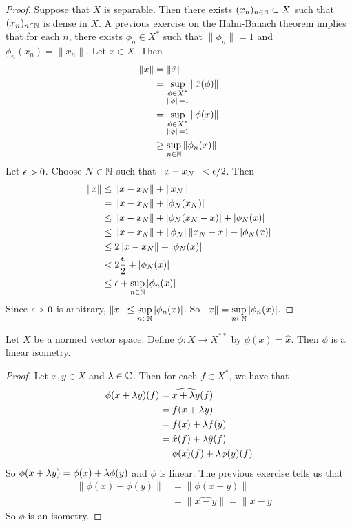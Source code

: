 \documentclass{book}
\begin{document}
	\begin{proof}
		Suppose that $X$ is separable. Then there exists $(x_n)_{n \in \mathbb{N}} \subset X$ such that $(x_n)_{n \in \mathbb{N}}$ is dense in $X$. A previous exercise on the Hahn-Banach theorem implies that for each $n$, there exists $\phi_n \in X^*$ such that $\|\phi_n\| = 1$ and $\phi_n(x_n) = \|x_n\|$. Let $x \in X$. Then 
		\begin{align*}
			\|x\| 
			&= \|\hat{x}\| \\
			&= \sup_{\substack{\phi \in X^* \\ \|\phi\| = 1}} \|\hat{x}(\phi)\| \\
			&= \sup_{\substack{\phi \in X^* \\ \|\phi\| = 1}} \|\phi(x)\| \\
			& \geq \sup_{n \in \mathbb{N}} \|\phi_n(x)\| \\
		\end{align*}
		Let $\epsilon > 0$. Choose $N \in \mathbb{N}$ such that $\|x - x_N\| < \epsilon/2$. Then
		\begin{align*}
			\|x\| 
			& \leq \|x - x_N\| + \|x_N\| \\
			& = \|x - x_N\| + |\phi_N(x_N)| \\
			& \leq \|x - x_N\| + |\phi_N(x_N - x)| + |\phi_N(x)| \\
			& \leq \|x - x_N\| + \|\phi_N\|\|x_N - x\| + |\phi_N(x)| \\
			& \leq 2\|x - x_N\| + |\phi_N(x)| \\
			& < 2 \frac{\epsilon}{2} +  |\phi_N(x)| \\
			& \leq \epsilon + \sup_{n \in \mathbb{N}} |\phi_n(x)|
		\end{align*}
		Since $\epsilon >0$ is arbitrary, $\|x\| \leq \sup\limits_{n \in \mathbb{N}} |\phi_n(x)|$. So $\|x\| = \sup\limits_{n \in \mathbb{N}} |\phi_n(x)|$.
	\end{proof}
	
	
	\begin{ex} \lex{}
		Let $X$ be a normed vector space. Define $\phi : X \rightarrow X^{**}$ by $\phi(x) = \hat{x}$. Then $\phi$ is a linear isometry. 
	\end{ex}
	
	\begin{proof}
		Let $x,y \in X$ and $\lambda \in \mathbb{C}$. Then for each $f \in X^*$, we have that 
		\begin{align*}
			\phi(x+ \lambda y)(f) 
			&= \widehat{x+ \lambda y}(f) \\
			&= f(x+\lambda y) \\
			&= f(x) + \lambda f(y) \\
			&= \hat{x}(f) + \lambda \hat{y}(f)\\
			&= \phi(x)(f) + \lambda \phi(y)(f)
		\end{align*} 
		So $\phi(x+ \lambda y) = \phi(x) + \lambda \phi(y)$ and $\phi$ is linear. The previous exercise tells us that 
		\begin{align*}
			\|\phi(x) - \phi(y) \|
			&= \|\phi(x-y)\|\\
			&= \|\widehat{x-y} \|= \|x-y \|
		\end{align*}
		So $\phi$ is an isometry.
	\end{proof}
	
\end{document}
